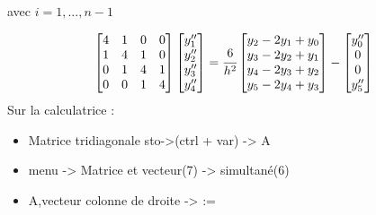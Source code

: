 


\hformbar









avec $i = 1, ..., n-1$


\[
\begin{bmatrix}
4 & 1 & 0 & 0 \\
1 & 4 & 1 & 0 \\
0 & 1 & 4 & 1 \\
0 & 0 & 1 & 4 \\
\end{bmatrix}
\begin{bmatrix}
y''_1 \\
y''_2 \\
y''_3 \\
y''_4 \\
\end{bmatrix}
=
\cfrac{6}{h^2}
\begin{bmatrix}
y_2 - 2y_1 + y_0 \\
y_3 - 2y_2 + y_1 \\
y_4 - 2y_3 + y_2 \\
y_5 - 2y_4 + y_3 \\
\end{bmatrix}
-
\begin{bmatrix}
y''_0 \\
0 \\
0 \\
y''_5 \\
\end{bmatrix}
\]
Sur la calculatrice : 
\begin{itemize}
    \item Matrice tridiagonale sto->(ctrl + var) -> A
    \item menu -> Matrice et vecteur(7) -> simultané(6)
    \item A,vecteur colonne de droite -> :=
\end{itemize}


